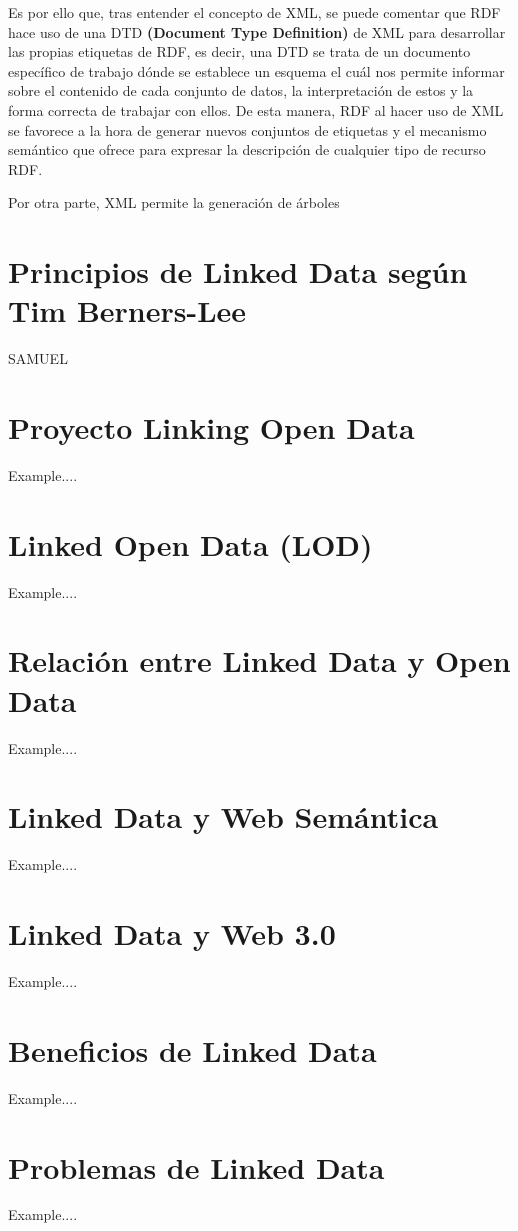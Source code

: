 \documentclass[11pt]{report}
\begin{document}
	Es por ello que, tras entender el concepto de XML, se puede comentar que RDF hace uso de una DTD \textbf{(Document Type Definition)} de XML para desarrollar las propias etiquetas de RDF, es decir, una DTD se trata de un documento específico de trabajo dónde se establece un esquema el cuál nos permite informar sobre el contenido de cada conjunto de datos, la interpretación de estos y la forma correcta de trabajar con ellos. De esta manera, RDF al hacer uso de XML se favorece a la hora de generar nuevos conjuntos de etiquetas y el mecanismo semántico que ofrece para expresar la descripción de cualquier tipo de recurso RDF.

	Por otra parte, XML permite la generación de árboles

	\chapter{Principios de Linked Data según Tim Berners-Lee}
	SAMUEL

	\chapter{Proyecto Linking Open Data}
	Example....

	\chapter{Linked Open Data (LOD)}
	Example....

	\chapter{Relación entre Linked Data y Open Data}
	Example....

	\chapter{Linked Data y Web Semántica}
	Example....

	\chapter{Linked Data y Web 3.0}
	Example....

	\chapter{Beneficios de Linked Data}
	Example....

	\chapter{Problemas de Linked Data}
	Example....
\end{document}
